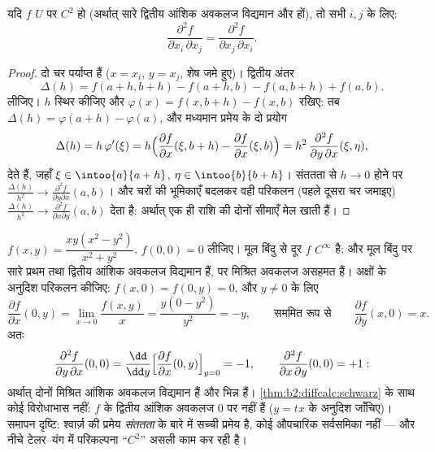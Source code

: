 \begin{theorem}[श्वार्ज़]\label{thm:b2:diffcalc:schwarz}
यदि $f$ $U$ पर $C^2$ हो (अर्थात् सारे द्वितीय आंशिक अवकलज विद्यमान और 
हों), तो सभी $i, j$ के लिए:
\[
\frac{\partial^2 f}{\partial x_i\,\partial x_j}
= \frac{\partial^2 f}{\partial x_j\,\partial x_i} .
\]
\end{theorem}

\begin{proof}
दो चर पर्याप्त हैं ($x = x_i$, $y = x_j$, शेष जमे हुए)। द्वितीय अंतर
\[
\Delta(h) = f(a + h, b + h) - f(a + h, b) - f(a, b + h) + f(a,b) .
\]
लीजिए। $h$ स्थिर कीजिए और $\varphi(x) = f(x, b+h) - f(x, b)$ रखिए: तब $\Delta(h)
= \varphi(a + h) - \varphi(a)$, और मध्यमान प्रमेय के दो प्रयोग
\[
\Delta(h) = h\,\varphi'(\xi)
= h\Bigl(\frac{\partial f}{\partial x}(\xi, b+h) -
\frac{\partial f}{\partial x}(\xi, b)\Bigr)
= h^2\,\frac{\partial^2 f}{\partial y\,\partial x}(\xi, \eta),
\]
देते हैं, जहाँ $\xi \in \intoo{a}{a+h}$, $\eta \in \intoo{b}{b+h}$। संततता से $h \to 0$ होने पर $\frac{\Delta(h)}{h^2} \to \frac{\partial^2 f}{\partial
y\partial x}(a, b)$। और चरों की भूमिकाएँ
बदलकर वही परिकलन (पहले दूसरा चर जमाइए) $\frac{\Delta(h)}{h^2} \to \frac{\partial^2 f}{\partial x
\partial y}(a,b)$ देता है: अर्थात् एक ही राशि
की दोनों सीमाएँ मेल खाती हैं।
\end{proof}

\begin{example}[$C^2$ क्यों चाहिए: पियानो का प्रतिउदाहरण]\label{ex:b2:diffcalc:peano}
$f(x, y) = \dfrac{xy(x^2 - y^2)}{x^2 + y^2}$, $f(0,0) = 0$ लीजिए। मूल बिंदु से दूर $f$ $C^\infty$ है; और मूल बिंदु पर सारे प्रथम
तथा द्वितीय आंशिक अवकलज विद्यमान हैं, पर मिश्रित अवकलज असहमत हैं। अक्षों
के अनुदिश परिकलन कीजिए: $f(x, 0) = f(0, y) = 0$, और $y \neq 0$ के लिए
\[
\frac{\partial f}{\partial x}(0, y)
= \lim_{x\to0}\frac{f(x,y)}{x}
= \frac{y(0 - y^2)}{y^2} = -y ,
\qquad\text{सममित रूप से}\qquad
\frac{\partial f}{\partial y}(x, 0) = x .
\]
अतः
\[
\frac{\partial^2 f}{\partial y\,\partial x}(0,0)
= \frac{\dd}{\dd y}\Bigl[\frac{\partial f}{\partial
x}(0,y)\Bigr]_{y=0} = -1,
\qquad
\frac{\partial^2 f}{\partial x\,\partial y}(0,0) = +1 :
\]
अर्थात् दोनों मिश्रित आंशिक अवकलज विद्यमान हैं और भिन्न हैं। \cref{thm:b2:diffcalc:schwarz} के साथ
कोई विरोधाभास नहीं: $f$ के द्वितीय आंशिक अवकलज $0$ पर  नहीं हैं ($y = tx$
के अनुदिश जाँचिए)। समापन दृष्टि: श्वार्ज़ की प्रमेय \emph{संततता} के बारे
में सच्ची प्रमेय है, कोई औपचारिक सर्वसमिका नहीं --- और नीचे टेलर--यंग में
परिकल्पना ``$C^2$'' असली काम कर रही है।
\end{example}

